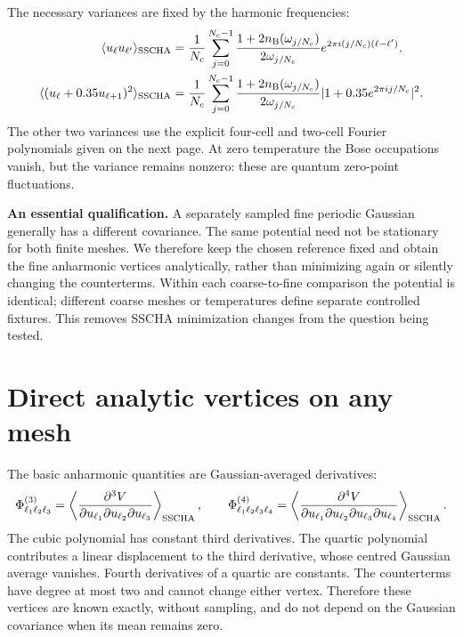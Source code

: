 \documentclass[11pt,a4paper]{article}
\newcommand{\pageheading}[1]{\clearpage\section{#1}}
\begin{document}
The necessary variances are fixed by the harmonic frequencies:
\begin{align}
 \langle u_\ell u_{\ell'}\rangle_{\rm SSCHA}
 &=\frac1{N_c}\sum_{j=0}^{N_c-1}
 \frac{1+2n_{\rm B}(\omega_{j/N_c})}{2\omega_{j/N_c}}
              e^{2\pi i(j/N_c)(\ell-\ell')},\\
 \langle(u_\ell+0.35u_{\ell+1})^2\rangle_{\rm SSCHA}
 &=\frac1{N_c}\sum_{j=0}^{N_c-1}
 \frac{1+2n_{\rm B}(\omega_{j/N_c})}{2\omega_{j/N_c}}
              |1+0.35e^{2\pi i j/N_c}|^2.
\end{align}
The other two variances use the explicit four-cell and two-cell Fourier
polynomials given on the next page. At zero temperature the Bose occupations
vanish, but the variance remains nonzero: these are quantum zero-point fluctuations.

\textbf{An essential qualification.} A separately sampled fine periodic Gaussian
generally has a different covariance. The same potential need not be stationary
for both finite meshes. We therefore keep the chosen reference fixed and obtain
the fine anharmonic vertices analytically, rather than minimizing again or
silently changing the counterterms. Within each coarse-to-fine comparison the
potential is identical; different coarse meshes or temperatures define separate
controlled fixtures. This removes SSCHA minimization changes from the question
being tested.

\pageheading{Direct analytic vertices on any mesh}
The basic anharmonic quantities are Gaussian-averaged derivatives:
\begin{equation}
 \Phi^{(3)}_{\ell_1\ell_2\ell_3}
 =\left\langle\frac{\partial^3 V}
 {\partial u_{\ell_1}\partial u_{\ell_2}\partial u_{\ell_3}}
 \right\rangle_{\rm SSCHA},\qquad
 \Phi^{(4)}_{\ell_1\ell_2\ell_3\ell_4}
 =\left\langle\frac{\partial^4 V}
 {\partial u_{\ell_1}\partial u_{\ell_2}\partial u_{\ell_3}\partial u_{\ell_4}}
 \right\rangle_{\rm SSCHA}.
\end{equation}
The cubic polynomial has constant third derivatives. The quartic polynomial
contributes a linear displacement to the third derivative, whose centred
Gaussian average vanishes. Fourth derivatives of a quartic are constants.
The counterterms have degree at most two and cannot change either vertex.
Therefore these vertices are known exactly, without sampling, and do not depend
on the Gaussian covariance when its mean remains zero.
\end{document}
